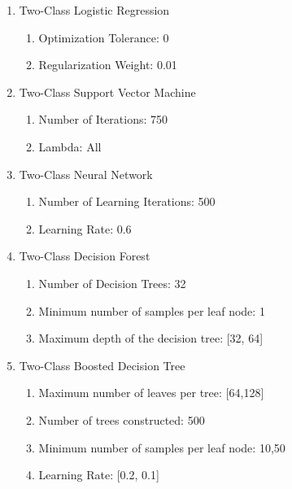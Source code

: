 \begin{enumerate}
    \item{Two-Class Logistic Regression}
    
    \begin{enumerate}
        \item{Optimization Tolerance:} 0
        \item{Regularization Weight:} 0.01
    \end{enumerate}
    
    \item{Two-Class Support Vector Machine}
    
    \begin{enumerate}
        \item{Number of Iterations:} 750
        \item{Lambda:} All
    \end{enumerate}
    
    \item{Two-Class Neural Network}
    
    \begin{enumerate}
        \item{Number of Learning Iterations:} 500
        \item{Learning Rate:}  0.6
    \end{enumerate}
    
    \item{Two-Class Decision Forest}

    \begin{enumerate}
        \item{Number of Decision Trees:} 32
        \item{Minimum number of samples per leaf node:} 1
        \item{Maximum depth of the decision tree:} [32, 64]
    \end{enumerate}
    
    \item{Two-Class Boosted Decision Tree}
    
    \begin{enumerate}
        \item{Maximum number of leaves per tree:} [64,128]
        \item{Number of trees constructed:} 500
        \item{Minimum number of samples per leaf node:} 10,50
        \item{Learning Rate:} [0.2, 0.1]
    \end{enumerate}
    
\end{enumerate}


